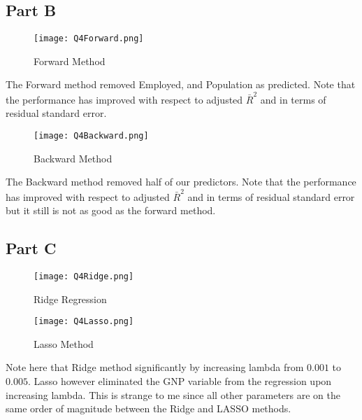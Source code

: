 \documentclass{article}
\begin{document}
\subsection*{Part B}
\begin{figure}[hbt!]
\centering
\texttt{[image: Q4Forward.png]}
\caption{Forward Method}
\end{figure}

The Forward method removed Employed, and Population as predicted. Note that the performance has improved with respect to adjusted $\bar{R}^2$ and in terms of residual standard error.

\begin{figure}[hbt!]
\centering
\texttt{[image: Q4Backward.png]}
\caption{Backward Method}
\end{figure}

The Backward method removed half of our predictors. Note that the performance has improved with respect to adjusted $\bar{R}^2$ and in terms of residual standard error but it still is not as good as the forward method.

\subsection*{Part C}
\begin{figure}[hbt!]
\centering
\texttt{[image: Q4Ridge.png]}
\caption{Ridge Regression}
\end{figure}

\begin{figure}[hbt!]
\centering
\texttt{[image: Q4Lasso.png]}
\caption{Lasso Method}
\end{figure}

Note here that Ridge method significantly by increasing lambda from $0.001$ to $0.005$. Lasso however eliminated the GNP variable from the regression upon increasing lambda. This is strange to me since all other parameters are on the same order of magnitude between the Ridge and LASSO methods.
\end{document}

